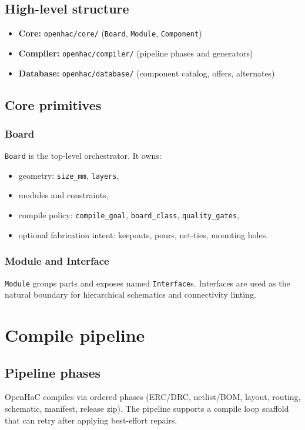 \documentclass[11pt]{report}
\begin{document}
\section{High-level structure}
\begin{itemize}
  \item \textbf{Core:} \texttt{openhac/core/} (\texttt{Board}, \texttt{Module}, \texttt{Component})
  \item \textbf{Compiler:} \texttt{openhac/compiler/} (pipeline phases and generators)
  \item \textbf{Database:} \texttt{openhac/database/} (component catalog, offers, alternates)
\end{itemize}

\section{Core primitives}
\subsection{Board}
\texttt{Board} is the top-level orchestrator. It owns:
\begin{itemize}
  \item geometry: \texttt{size\_mm}, \texttt{layers},
  \item modules and constraints,
  \item compile policy: \texttt{compile\_goal}, \texttt{board\_class}, \texttt{quality\_gates},
  \item optional fabrication intent: keepouts, pours, net-ties, mounting holes.
\end{itemize}

\subsection{Module and Interface}
\texttt{Module} groups parts and exposes named \texttt{Interface}s.
Interfaces are used as the natural boundary for hierarchical schematics and connectivity linting.

\chapter{Compile pipeline}

\section{Pipeline phases}
OpenHaC compiles via ordered phases (ERC/DRC, netlist/BOM, layout, routing, schematic, manifest, release zip).
The pipeline supports a compile loop scaffold that can retry after applying best-effort repairs.
\end{document}
